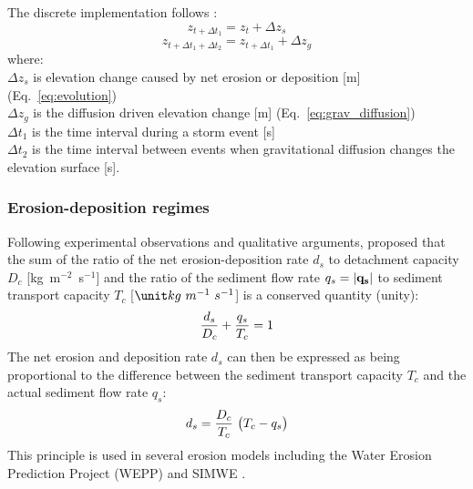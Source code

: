 \documentclass[gmd, manuscript]{copernicus}
\begin{document}
\noindent
The discrete implementation follows \cite{Thaxton2004}:
\begin{equation}
\label{eq:evolution_disc1} 
z_{t+ \Delta t_1} = z_t + \Delta z_s  
\end{equation}
\begin{equation}
\label{eq:evolution_disc2} 
z_{t+\Delta t_1+\Delta t_2} = z_{t+\Delta t_1} + \Delta z_g 
\end{equation}
{\small
where: \\
\noindent
\hspace*{0.5em} $\Delta z_s$ is elevation change caused by net erosion or deposition
[\unit{m}] (Eq.~\ref{eq:evolution})\\
\hspace*{0.5em} $\Delta z_g$ is the diffusion driven elevation change
[\unit{m}] (Eq.~\ref{eq:grav_diffusion})\\
\hspace*{0.5em} $\Delta t_1$ is the time interval during a storm event [\unit{s}]\\
\hspace*{0.5em} $\Delta t_2$ is the time interval between events
when gravitational diffusion changes the elevation surface [\unit{s}].\\
}

\subsubsection{Erosion-deposition regimes}

Following experimental observations and qualitative arguments, 
\cite{Foster1977} proposed that the sum of 
the ratio of the net erosion-deposition rate $d_s$ 
to detachment capacity  $D_c$  [\unit{kg~m}$^{-2}$~\unit{s}$^{-1}$] 
and the ratio of the sediment flow rate $q_s = |{\bf q_s}|$ 
to sediment transport capacity $T_c$ [$\unit kg~m^{-1}~s^{-1}$]
is a conserved quantity (unity):
\begin{equation}
\label{eq:foster_law}
{d_s \over D_c} + {q_s \over T_c} = 1
\end{equation}
The net erosion and deposition rate $d_s$ can then be expressed 
as being proportional to the difference between
the sediment transport capacity $T_c$ 
and the actual sediment flow rate $q_s$:
\begin{equation}
\label{eq:sigma}
d_s = {D_c \over T_c}~\bigl( T_c - q_s\bigr)
\end{equation}
\noindent
This principle is used in several erosion models 
including the Water Erosion Prediction Project (WEPP) \citep{Flanagan2013} 
and SIMWE \citep{Mitas1998}. 
\end{document}
